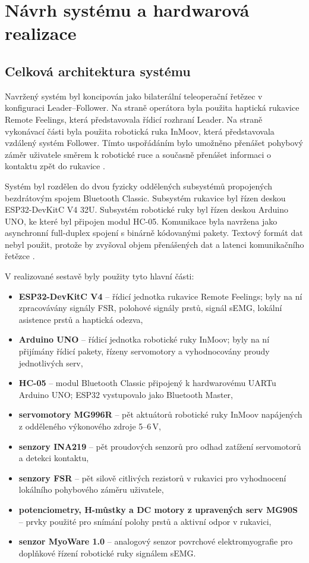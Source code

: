 
\chapter{Návrh systému a hardwarová realizace}
\label{chap:navrh-systemu}

\section{Celková architektura systému}
\label{sec:celkova-architektura}

Navržený systém byl koncipován jako bilaterální teleoperační řetězec v konfiguraci Leader--Follower. Na straně operátora byla použita haptická rukavice Remote Feelings, která představovala řídicí rozhraní Leader. Na straně vykonávací části byla použita robotická ruka InMoov, která představovala vzdálený systém Follower. Tímto uspořádáním bylo umožněno přenášet pohybový záměr uživatele směrem k robotické ruce a současně přenášet informaci o kontaktu zpět do rukavice \cite{GIUDICI2025}.

Systém byl rozdělen do dvou fyzicky oddělených subsystémů propojených bezdrátovým spojem Bluetooth Classic. Subsystém rukavice byl řízen deskou ESP32-DevKitC V4 32U. Subsystém robotické ruky byl řízen deskou Arduino UNO, ke které byl připojen modul HC-05. Komunikace byla navržena jako asynchronní full-duplex spojení s binárně kódovanými pakety. Textový formát dat nebyl použit, protože by zvyšoval objem přenášených dat a latenci komunikačního řetězce \cite{Wu2024613}.

V realizované sestavě byly použity tyto hlavní části:

\begin{itemize}
    \item \textbf{ESP32-DevKitC V4} -- řídicí jednotka rukavice Remote Feelings; byly na ní zpracovávány signály FSR, polohové signály prstů, signál sEMG, lokální asistence prstů a haptická odezva,
    \item \textbf{Arduino UNO} -- řídicí jednotka robotické ruky InMoov; byly na ní přijímány řídicí pakety, řízeny servomotory a vyhodnocovány proudy jednotlivých serv,
    \item \textbf{HC-05} -- modul Bluetooth Classic připojený k hardwarovému UARTu Arduino UNO; ESP32 vystupovalo jako Bluetooth Master,
    \item \textbf{servomotory MG996R} -- pět aktuátorů robotické ruky InMoov napájených z odděleného výkonového zdroje 5--6\,V,
    \item \textbf{senzory INA219} -- pět proudových senzorů pro odhad zatížení servomotorů a detekci kontaktu,
    \item \textbf{senzory FSR} -- pět silově citlivých rezistorů v rukavici pro vyhodnocení lokálního pohybového záměru uživatele,
    \item \textbf{potenciometry, H-můstky a DC motory z upravených serv MG90S} -- prvky použité pro snímání polohy prstů a aktivní odpor v rukavici,
    \item \textbf{senzor MyoWare 1.0} -- analogový senzor povrchové elektromyografie pro doplňkové řízení robotické ruky signálem sEMG\@.
\end{itemize}

